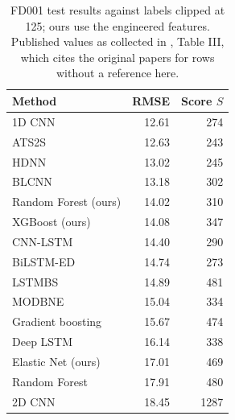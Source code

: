 \begin{table}[t]
\centering
\caption{FD001 test results against labels clipped at 125; ours use the
engineered features. Published values as collected in
\cite{ragab2020attention}, Table III, which cites the original papers for
rows without a reference here.}
\label{tab:published}
\begin{tabular}{lrr}
\hline
Method & RMSE & Score $S$ \\
\hline
1D CNN \cite{li2018dcnn}             & 12.61 & 274 \\
ATS2S \cite{ragab2020attention}      & 12.63 & 243 \\
HDNN                                 & 13.02 & 245 \\
BLCNN                                & 13.18 & 302 \\
Random Forest (ours)                 & 14.02 & 310 \\
XGBoost (ours)                       & 14.08 & 347 \\
CNN-LSTM                             & 14.40 & 290 \\
BiLSTM-ED                            & 14.74 & 273 \\
LSTMBS                               & 14.89 & 481 \\
MODBNE \cite{zhang2017modbne}        & 15.04 & 334 \\
Gradient boosting \cite{zhang2017modbne} & 15.67 & 474 \\
Deep LSTM \cite{zheng2017lstm}       & 16.14 & 338 \\
Elastic Net (ours)                   & 17.01 & 469 \\
Random Forest \cite{zhang2017modbne} & 17.91 & 480 \\
2D CNN \cite{babu2016cnn}            & 18.45 & 1287 \\
\hline
\end{tabular}
\end{table}
